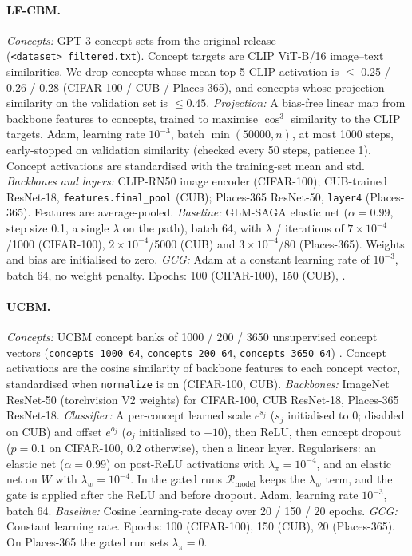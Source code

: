 \paragraph{LF-CBM.}
\emph{Concepts:} GPT-3 concept sets from the original release (\texttt{<dataset>\_filtered.txt}).
Concept targets are CLIP ViT-B/16 image--text similarities. We drop concepts whose mean top-5
CLIP activation is $\le$ 0.25 / 0.26 / 0.28 (CIFAR-100 / CUB / Places-365), and concepts
whose projection similarity on the validation set is $\le 0.45$.
\emph{Projection:} A bias-free linear map from backbone features to concepts, trained to
maximise $\cos^3$ similarity to the CLIP targets. Adam, learning rate $10^{-3}$, batch
$\min(50000, n)$, at most 1000 steps, early-stopped on validation similarity (checked every 50
steps, patience 1). Concept activations are standardised with the training-set mean and std.
\emph{Backbones and layers:} CLIP-RN50 image encoder (CIFAR-100); CUB-trained ResNet-18,
\texttt{features.final\_pool} (CUB); Places-365 ResNet-50, \texttt{layer4} (Places-365).
Features are average-pooled.
\emph{Baseline:} GLM-SAGA elastic net ($\alpha=0.99$, step size 0.1, a single $\lambda$ on the
path), batch 64, with $\lambda$ / iterations of $7\times10^{-4}$/1000 (CIFAR-100),
$2\times10^{-4}$/5000 (CUB) and $3\times10^{-4}$/80 (Places-365). Weights and bias are
initialised to zero.
\emph{GCG:} Adam at a constant learning rate of $10^{-3}$, batch 64, no weight penalty.
Epochs: 100 (CIFAR-100), 150 (CUB), .

\paragraph{UCBM.}
\emph{Concepts:} UCBM concept banks of 1000 / 200 / 3650 unsupervised concept vectors
(\texttt{concepts\_1000\_64}, \texttt{concepts\_200\_64}, \texttt{concepts\_3650\_64})
. Concept activations are the cosine similarity of
backbone features to each concept vector, standardised when \texttt{normalize} is on
(CIFAR-100, CUB).
\emph{Backbones:} ImageNet ResNet-50 (torchvision V2 weights) for CIFAR-100, CUB ResNet-18,
Places-365 ResNet-18.
\emph{Classifier:} A per-concept learned scale $e^{s_j}$ ($s_j$ initialised to 0; disabled on
CUB) and offset $e^{o_j}$ ($o_j$ initialised to $-10$), then ReLU, then concept dropout ($p=0.1$
on CIFAR-100, $0.2$ otherwise), then a linear layer. Regularisers: an elastic net
($\alpha=0.99$) on post-ReLU activations with $\lambda_\pi=10^{-4}$, and an elastic net on $W$
with $\lambda_w=10^{-4}$. In the gated runs $\mathcal{R}_{\text{model}}$ keeps the $\lambda_w$
term, and the gate is applied after the ReLU and before dropout. Adam, learning rate
$10^{-3}$, batch 64.
\emph{Baseline:} Cosine learning-rate decay over 20 / 150 / 20 epochs.
\emph{GCG:} Constant learning rate. Epochs: 100 (CIFAR-100), 150 (CUB), 20 (Places-365). On
Places-365 the gated run sets $\lambda_\pi=0$.

